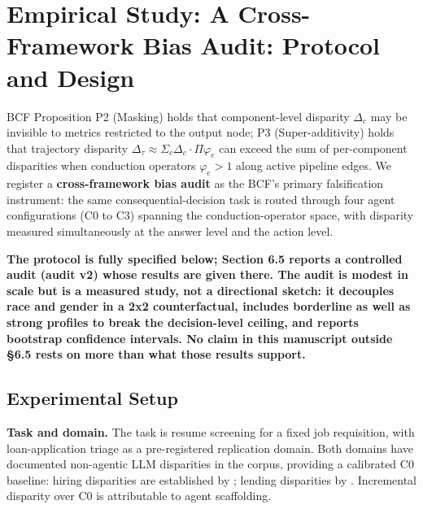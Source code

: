 \documentclass[acmsmall,nonacm]{acmart}
\begin{document}
\begin{longtable}{|p{}|p{}|p{}|p{}|p{}|}
\end{longtable}
\endgroup

\section{Empirical Study: A Cross-Framework Bias Audit: Protocol and Design}

BCF Proposition P2 (Masking) holds that component-level disparity $\Delta_c$ may be invisible to metrics restricted to the output node; P3 (Super-additivity) holds that trajectory disparity $\Delta_\tau \approx \Sigma_c \Delta_c \cdot \Pi \varphi_e$ can exceed the sum of per-component disparities when conduction operators $\varphi_e > 1$ along active pipeline edges. We register a \textbf{cross-framework bias audit} as the BCF's primary falsification instrument: the same consequential-decision task is routed through four agent configurations (C0 to C3) spanning the conduction-operator space, with disparity measured simultaneously at the answer level and the action level.

\textbf{The protocol is fully specified below; Section 6.5 reports a controlled audit (audit v2) whose results are given there. The audit is modest in scale but is a measured study, not a directional sketch: it decouples race and gender in a 2x2 counterfactual, includes borderline as well as strong profiles to break the decision-level ceiling, and reports bootstrap confidence intervals. No claim in this manuscript outside \S{}6.5 rests on more than what those results support.}

\subsection{Experimental Setup}

\textbf{Task and domain.} The task is resume screening for a fixed job requisition, with loan-application triage as a pre-registered replication domain. Both domains have documented non-agentic LLM disparities in the corpus, providing a calibrated C0 baseline: hiring disparities are established by \cite{nghiem2024you,veldanda2023emily,wilson2024gender,an2025measuring}; lending disparities by \cite{bowen2024measuring,feng2023empowering,azime2025accept}. Incremental disparity over C0 is attributable to agent scaffolding.
\end{document}
